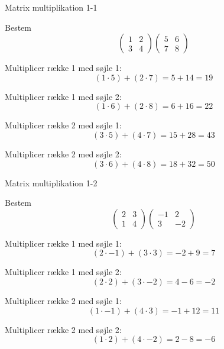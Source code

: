 \documentclass{article}
\begin{document}

\tableofcontents
\newpage

\begin{exercise}{Matrix multiplikation 1-1}

Bestem
\[
\begin{pmatrix} 1 & 2 \\ 3 & 4 \end{pmatrix} \begin{pmatrix} 5 & 6 \\ 7 & 8 \end{pmatrix}
\]


\hint

Multiplicer række 1 med søjle 1:
\[
(1 \cdot 5) + (2 \cdot 7) = 5 + 14 = 19
\]

\hint

Multiplicer række 1 med søjle 2:
\[
(1 \cdot 6) + (2 \cdot 8) = 6 + 16 = 22
\]

\hint

Multiplicer række 2 med søjle 1:
\[
(3 \cdot 5) + (4 \cdot 7) = 15 + 28 = 43
\]

\hint

Multiplicer række 2 med søjle 2:
\[
(3 \cdot 6) + (4 \cdot 8) = 18 + 32 = 50
\]

\end{exercise}

\newpage

\begin{exercise}{Matrix multiplikation 1-2}

Bestem
\[
\begin{pmatrix} 2 & 3 \\ 1 & 4 \end{pmatrix} \begin{pmatrix} -1 & 2 \\ 3 & -2 \end{pmatrix}
\]


\hint

Multiplicer række 1 med søjle 1:
\[
(2 \cdot -1) + (3 \cdot 3) = -2 + 9 = 7
\]

\hint

Multiplicer række 1 med søjle 2:
\[
(2 \cdot 2) + (3 \cdot -2) = 4 - 6 = -2
\]

\hint

Multiplicer række 2 med søjle 1:
\[
(1 \cdot -1) + (4 \cdot 3) = -1 + 12 = 11
\]

\hint

Multiplicer række 2 med søjle 2:
\[
(1 \cdot 2) + (4 \cdot -2) = 2 - 8 = -6
\]

\end{exercise}
\end{document}
